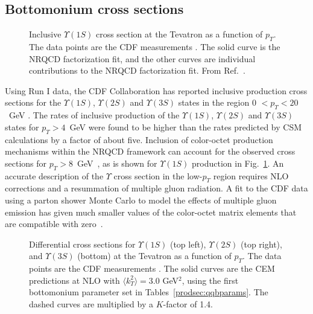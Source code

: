 \subsection{Bottomonium cross sections}
\label{prodsec:tevatronbottom}

\begin{figure}[htb]
\begin{center}
\caption{Inclusive $\Upsilon(1S)$ cross section at the Tevatron as a
function of $p_T$. The data points are the CDF measurements
\cite{Abe:1997jz}. The solid curve is the NRQCD factorization fit, and
the other curves are individual contributions to the
NRQCD factorization fit.  From
Ref.~\cite{Kramer:2001hh,LHC-workshop}.}
\label{fig-tevatron_ups1S}
\end{center}
\end{figure}

Using Run I data, the CDF Collaboration has reported inclusive
production cross sections for the $\Upsilon(1S)$, $\Upsilon(2S)$ and
$\Upsilon(3S)$ states in the region 0 $< p_T < 20$~GeV
\cite{Acosta:2001gv}.  The rates of inclusive
production of the $\Upsilon(1S)$, $\Upsilon(2S)$ and $\Upsilon(3S)$
states for $p_T > 4$~GeV were found to be higher than the rates
predicted by CSM calculations by a factor of about five. 
Inclusion of color-octet production mechanisms within the 
NRQCD framework can account for the observed cross sections for 
$p_T > 8$~GeV~\cite{Cho:1995vh,Cho:1995ce,LHC-workshop,Braaten:2000cm}, 
as is shown for $\Upsilon(1S)$ production in Fig.~\ref{fig-tevatron_ups1S}. 
An accurate description of the $\Upsilon$ cross section in the low-$p_T$
region requires NLO corrections and a resummation of multiple gluon 
radiation. A fit to the CDF data using a parton shower Monte Carlo 
to model the effects of multiple gluon emission has given much 
smaller values of the color-octet matrix elements that are compatible 
with zero~\cite{Domenech:2000ri}.

\begin{figure}[htb]
\setlength{\epsfxsize=0.95\textwidth}
\setlength{\epsfysize=0.5\textheight}
\centerline{}
\caption{Differential cross sections for $\Upsilon(1S)$ (top left),
$\Upsilon(2S)$ (top right), and $\Upsilon(3S)$ (bottom) at the Tevatron
as a function of $p_T$. The data points are the CDF measurements
\cite{Acosta:2001gv}. The solid curves are the CEM predictions at NLO
with $\langle k_T^2\rangle = 3.0$ GeV$^2$, using the first bottomonium
parameter set in Tables~\ref{prodsec:qqbparams}. The dashed curves are
multiplied by a $K$-factor of 1.4. }
\label{upscdfptdep}
\end{figure}

